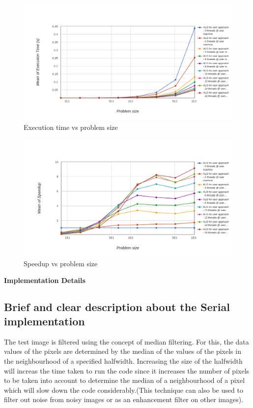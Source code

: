 \documentclass[runningheads, a4paper, oribibl]{llncs}
\begin{document}
\begin{figure}[h!]
    \centering
    \includegraphics[scale = 0.3]{q2/mean_executionTime.png}
    \caption{Execution time vs problem size}
    \label{fig:q2_time}
\end{figure}

\begin{figure}[h!]
    \centering
    \includegraphics[scale = 0.3]{q2/mean_speedup.png}
    \caption{Speedup vs problem size}
    \label{fig:q2_speedup}
\end{figure}


\textbf{Implementation Details}
\subsection{Brief and clear description about the Serial implementation}
The test image is filtered using the concept of median filtering. For this, the data values of the pixels are determined by the median of the values of the pixels in the neighbourhood of a specified halfwidth. Increasing the size of the halfwidth will increas the time taken to run the code since it increases the number of pixels to be taken into account to determine the median of a neighbourhood of a pixel which will slow down the code considerably.(This technique can also be used to filter out noise from noisy images or as an enhancement filter on other images).
\end{document}
